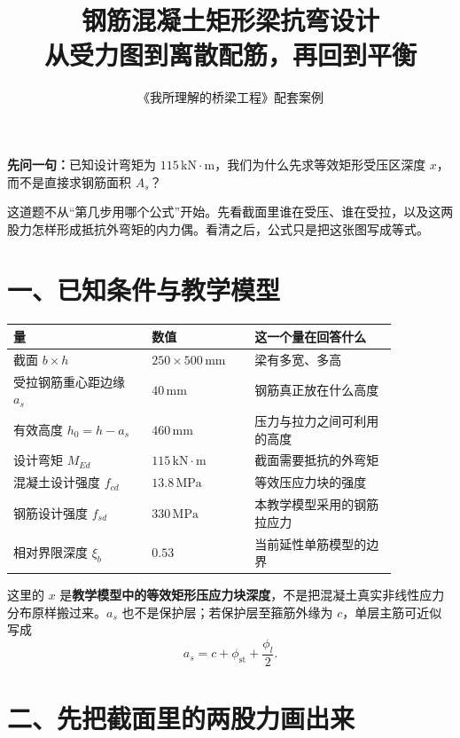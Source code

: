 \documentclass[11pt,a4paper]{ctexart}
\title{钢筋混凝土矩形梁抗弯设计\\\large 从受力图到离散配筋，再回到平衡}
\author{《我所理解的桥梁工程》配套案例}
\date{}
\begin{document}
\maketitle

\begin{questionbox}
\textbf{先问一句：}已知设计弯矩为 $115\,\mathrm{kN\!\cdot\!m}$，我们为什么先求等效矩形受压区深度 $x$，而不是直接求钢筋面积 $A_s$？
\end{questionbox}

这道题不从“第几步用哪个公式”开始。先看截面里谁在受压、谁在受拉，以及这两股力怎样形成抵抗外弯矩的内力偶。看清之后，公式只是把这张图写成等式。

\section*{一、已知条件与教学模型}

\begin{center}
\begin{tabular}{>{\raggedright\arraybackslash}p{0.31\linewidth}p{0.23\linewidth}p{0.32\linewidth}}
\toprule
量 & 数值 & 这一个量在回答什么 \\
\midrule
截面 $b\times h$ & $250\times500\,\mathrm{mm}$ & 梁有多宽、多高 \\
受拉钢筋重心距边缘 $a_s$ & $40\,\mathrm{mm}$ & 钢筋真正放在什么高度 \\
有效高度 $h_0=h-a_s$ & $460\,\mathrm{mm}$ & 压力与拉力之间可利用的高度 \\
设计弯矩 $M_{Ed}$ & $115\,\mathrm{kN\!\cdot\!m}$ & 截面需要抵抗的外弯矩 \\
混凝土设计强度 $f_{cd}$ & $13.8\,\mathrm{MPa}$ & 等效压应力块的强度 \\
钢筋设计强度 $f_{sd}$ & $330\,\mathrm{MPa}$ & 本教学模型采用的钢筋拉应力 \\
相对界限深度 $\xi_b$ & $0.53$ & 当前延性单筋模型的边界 \\
\bottomrule
\end{tabular}
\end{center}

这里的 $x$ 是\textbf{教学模型中的等效矩形压应力块深度}，不是把混凝土真实非线性应力分布原样搬过来。$a_s$ 也不是保护层；若保护层至箍筋外缘为 $c$，单层主筋可近似写成
\[
a_s=c+\phi_{\mathrm{st}}+\frac{\phi_l}{2}.
\]

\section*{二、先把截面里的两股力画出来}
\end{document}
